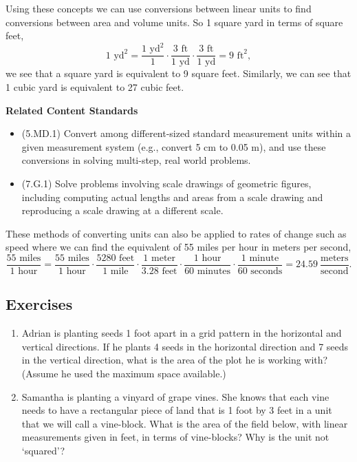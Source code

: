 \documentclass[
]{book}
\providecommand{\tightlist}{%
  \setlength{\itemsep}{0pt}\setlength{\parskip}{0pt}}
\newenvironment{standards}{}{}
\theoremstyle{definition}
\theoremstyle{definition}
\theoremstyle{definition}
\theoremstyle{definition}
\theoremstyle{remark}
\begin{document}
Using these concepts we can use conversions between linear units to find conversions between area and volume units. So 1 square yard in terms of square feet,
\[1 \mbox{ yd}^2 =\frac{1 \mbox{ yd}^2}{1} \cdot \frac{3 \mbox{ ft}}{1 \mbox{ yd}} \cdot \frac{3 \mbox{ ft}}{1 \mbox{ yd}} = 9 \mbox{ ft}^2,\] we see that a square yard is equivalent to 9 square feet.
Similarly, we can see that 1 cubic yard is equivalent to 27 cubic feet.

\begin{standards}

\begin{center}
\textbf{Related Content Standards}

\end{center}

\begin{itemize}
\tightlist
\item
  (5.MD.1) Convert among different-sized standard measurement units within a given measurement system (e.g., convert 5 cm to 0.05 m), and use these conversions in solving multi-step, real world problems.
\item
  (7.G.1) Solve problems involving scale drawings of geometric figures, including computing actual lengths and areas from a scale drawing and reproducing a scale drawing at a different scale.
\end{itemize}

\end{standards}

These methods of converting units can also be applied to rates of change such as speed where we can find the equivalent of 55 miles per hour in meters per second,
\[\frac{55 \mbox{ miles}}{1 \mbox{ hour}} = \frac{55 \mbox{ miles}}{1 \mbox{ hour}} \cdot \frac{5280 \mbox{ feet}}{1 \mbox{ mile}} \cdot \frac{1 \mbox{ meter}}{3.28 \mbox{ feet}} \cdot \frac{1 \mbox{ hour}}{60 \mbox{ minutes}} \cdot \frac{1 \mbox{ minute}}{60 \mbox{ seconds}} = 24.59 \: \frac{\mbox{meters}}{\mbox{second}}.\]

\hypertarget{exercises-43}{%
\subsection{Exercises}\label{exercises-43}}

\begin{enumerate}
\def\labelenumi{\arabic{enumi}.}
\item
  Adrian is planting seeds 1 foot apart in a grid pattern in the horizontal and vertical directions. If he plants 4 seeds in the horizontal direction and 7 seeds in the vertical direction, what is the area of the plot he is working with? (Assume he used the maximum space available.)
\item
  Samantha is planting a vinyard of grape vines. She knows that each vine needs to have a rectangular piece of land that is 1 foot by 3 feet in a unit that we will call a vine-block. What is the area of the field below, with linear measurements given in feet, in terms of vine-blocks? Why is the unit not `squared'?
\end{enumerate}
\end{document}
